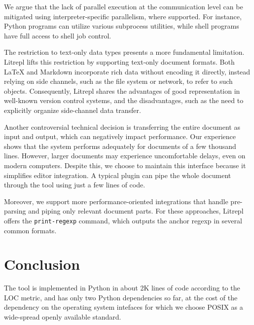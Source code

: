 \documentclass[a4paper,12pt,twocolumn]{article}
\begin{document}
We argue that the lack of parallel execution at the communication level can be
mitigated using interpreter-specific parallelism, where supported. For instance,
Python programs can utilize various subprocess utilities, while shell programs
have full access to shell job control.

The restriction to text-only data types presents a more fundamental limitation.
Litrepl lifts this restriction by supporting text-only document formats. Both
LaTeX and Markdown incorporate rich data without encoding it directly, instead
relying on side channels, such as the file system or network, to refer to such
objects. Consequently, Litrepl shares the advantages of good representation in
well-known version control systems, and the disadvantages, such as the need to
explicitly organize side-channel data transfer.

Another controversial technical decision is transferring the entire document as
input and output, which can negatively impact performance. Our experience shows
that the system performs adequately for documents of a few thousand lines.
However, larger documents may experience uncomfortable delays, even on modern
computers. Despite this, we choose to maintain this interface because it
simplifies editor integration. A typical plugin can pipe the whole document
through the tool using just a few lines of code.

Moreover, we support more performance-oriented integrations that handle
pre-parsing and piping only relevant document parts. For these approaches,
Litrepl offers the \verb|print-regexp| command, which outputs the anchor regexp
in several common formats.

\section{Conclusion}

The tool is implemented in Python in about 2K lines of code according to the LOC
metric, and has only two Python dependencies so far, at the cost of the
dependency on the operating system intefaces for which we choose POSIX as a
wide-spread openly available standard.

\printbibliography
\end{document}
